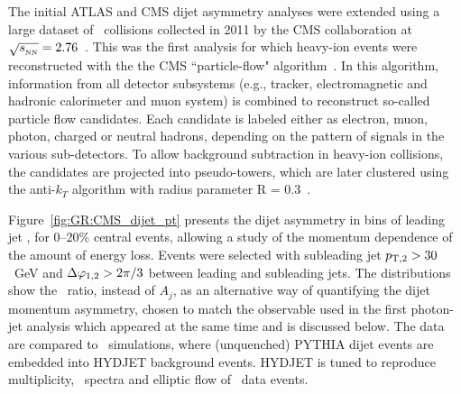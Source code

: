 The initial ATLAS and CMS dijet asymmetry analyses were extended using a 
large dataset of \PbPb\ collisions
collected in 2011 by the CMS collaboration at $\sqrt{s_{_{\rm NN}}}=2.76$\TeV~\cite{CMS_dijet}. 
This was the first analysis for which heavy-ion events were reconstructed
with the the  CMS ``particle-flow" 
algorithm~\cite{CMS-PAS-PFT-10-002,MattPFlow}. In this algorithm,
information from all detector subsystems (e.g., tracker, electromagnetic and hadronic
calorimeter and muon system) is combined to reconstruct so-called particle flow candidates.
Each candidate is labeled either as electron, muon, photon, charged or neutral hadrons,
depending on the pattern of signals in the various sub-detectors.
To allow background subtraction in heavy-ion collisions, the candidates are
projected into pseudo-towers, which are later clustered using the anti-$k_T$ algorithm 
with radius parameter R = 0.3~\cite{Cacciari:2008gp}.

Figure~\ref{fig:GR:CMS_dijet_pt} presents the dijet asymmetry in bins of leading jet
\pT, for 0--20\% central events, allowing a study of the momentum dependence of the amount of energy loss.
Events were selected with subleading jet $p_{\rm{T},2}> 30$~GeV and $\Delta\varphi_{1,2}>2\pi/3$ between leading and subleading jets.
The distributions show the \ptrat\ ratio, instead of $A_j$,  as an alternative
way of quantifying the dijet momentum asymmetry, chosen to match the 
observable used in the first photon-jet analysis which appeared at the same time and is discussed
below. The data are compared to \PYTHYD\ simulations, where
(unquenched) PYTHIA dijet events are embedded into HYDJET background events.
HYDJET is tuned to reproduce multiplicity, \pT\ spectra and elliptic flow of \PbPb\ 
data events.

